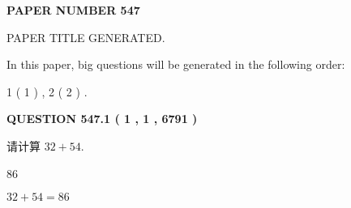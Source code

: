 \documentclass{ctexart}
\begin{document}
   
   
   
\newpage 
\setcounter{page}{ 
   547001 } 
   
   
   
   
 {\textbf{ \Large{ PAPER NUMBER  547  }}}
   
   
\vspace{0.2in}
   
   
   
   
   
   
   
   
 \vspace{0.2in}
 
 
 
 
   
   
 PAPER TITLE GENERATED.
   
   
   
\vspace{0.2in}
   
In this paper, big questions will be generated in the following order: 
   
   
   1 ( 1 )
 ,
   2 ( 2 )
 .
  
\vspace{0.2in}
  
{\textbf{\Large{QUESTION
547.1 
 ( 1 , 1 , 6791 )
}}}
  
  
 
请计算 $ %
32 +  %
54 $.
 
 
 
\noindent{}
 
 

86
 
 
\noindent{}
 
 

 
 
 
\noindent{}
 
 

$ %
32 +  %
54=   %
86$
 
 
\noindent{}
 
 

 
   
   
   
\end{document}
